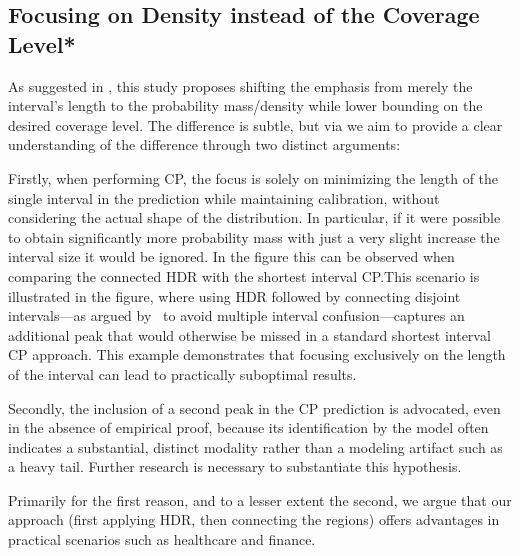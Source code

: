 \subsection{Focusing on Density instead of the Coverage Level*}\label{sec:density_focus}

As suggested in , this study proposes shifting the emphasis from merely the interval's length to the probability mass/density while lower bounding on the desired coverage level. The difference is subtle, but via  we aim to provide a clear understanding of the difference through two distinct arguments:

Firstly, when performing CP, the focus is solely on minimizing the length of the single interval in the prediction while maintaining calibration, without considering the actual shape of the distribution. In particular, if it were possible to obtain significantly more probability mass with just a very slight increase the interval size it would be ignored. In the figure this can be observed when comparing the connected HDR with the shortest interval CP.\@ This scenario is illustrated in the figure, where using HDR followed by connecting disjoint intervals—as argued by~\cite{sesia2021conformal} to avoid multiple interval confusion—captures an additional peak that would otherwise be missed in a standard shortest interval CP approach. This example demonstrates that focusing exclusively on the length of the interval can lead to practically suboptimal results.

Secondly, the inclusion of a second peak in the CP prediction is advocated, even in the absence of empirical proof, because its identification by the model often indicates a substantial, distinct modality rather than a modeling artifact such as a heavy tail. Further research is necessary to substantiate this hypothesis.

Primarily for the first reason, and to a lesser extent the second, we argue that our approach (first applying HDR, then connecting the regions) offers advantages in practical scenarios such as healthcare and finance.


